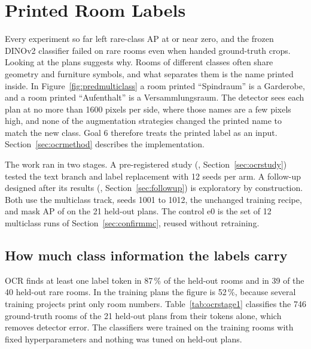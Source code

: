 \section{Printed Room Labels}
\label{sec:ocr}

Every experiment so far left rare-class AP at or near zero, and the frozen
DINOv2 classifier failed on rare rooms even when handed ground-truth crops.
Looking at the plans suggests why. Rooms of different classes often share
geometry and furniture symbols, and what separates them is the name printed
inside. In Figure~\ref{fig:predmulticlass} a room printed ``Spindraum'' is a
Garderobe, and a room printed ``Aufenthalt'' is a Versammlungsraum. The
detector sees each plan at no more than 1600 pixels per side, where those names
are a few pixels high, and none of the augmentation strategies changed the
printed name to match the new class. Goal 6 therefore treats the printed label
as an input. Section~\ref{sec:ocrmethod} describes the implementation.

The work ran in two stages. A pre-registered study
(, Section~\ref{sec:ocrstudy}) tested the text
branch and label replacement with 12 seeds per arm. A follow-up designed after
its results (,
Section~\ref{sec:followup}) is exploratory by construction. Both use the
multiclass track, seeds 1001 to 1012, the unchanged training recipe, and mask
AP of  on the 21 held-out plans. The control e0 is the set of 12
multiclass runs of Section~\ref{sec:confirmmc}, reused without retraining.

\subsection{How much class information the labels carry}

OCR finds at least one label token in 87\,\% of the held-out rooms and in 39 of
the 40 held-out rare rooms. In the training plans the figure is 52\,\%, because
several training projects print only room numbers. Table~\ref{tab:ocrstage1}
classifies the 746 ground-truth rooms of the 21 held-out plans from their tokens
alone, which removes detector error. The classifiers were trained on the
training rooms with fixed hyperparameters and nothing was tuned on held-out
plans.

